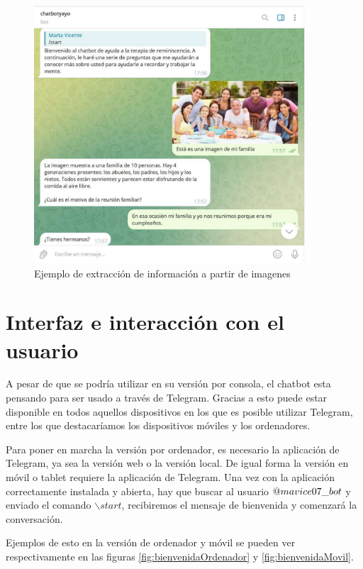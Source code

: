 \begin{figure}[h]
	\centering
	\includegraphics[width=0.9\textwidth]{Imagenes/extracInfoImag}
	\caption{Ejemplo de extracción de información a partir de imagenes}
	\label{fig:imagenFamilia}
\end{figure}

\section{Interfaz e interacción con el usuario}
A pesar de que se podría utilizar en su versión por consola, el chatbot esta pensando para ser usado a través de Telegram. Gracias a esto puede estar disponible en todos aquellos dispositivos en los que es posible utilizar Telegram, entre los que destacaríamos los dispositivos móviles y los ordenadores.

Para poner en marcha la versión por ordenador, es necesario la aplicación de Telegram, ya sea la versión web o la versión local. De igual forma la versión en móvil o tablet requiere la aplicación de Telegram. Una vez con la aplicación correctamente instalada y abierta, hay que buscar al usuario $\makeatletter @ mavice07\_bot$ y enviado el comando  $\backslash start$, recibiremos el mensaje de bienvenida y comenzará la conversación.

Ejemplos de esto en la versión de ordenador y móvil se pueden ver respectivamente en las figuras \ref{fig:bienvenidaOrdenador} y \ref{fig:bienvenidaMovil}.

